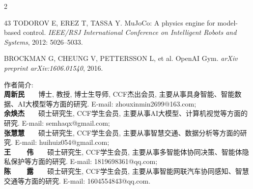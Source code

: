 \begin{multicols}{2}
{\begin{thebibliography}{43}
TODOROV E, EREZ T, TASSA Y. MuJoCo: A physics engine for model-based control. {\it IEEE/RSJ International Conference on Intelligent Robots and Systems}, 2012: 5026--5033.

BROCKMAN G, CHEUNG V, PETTERSSON L, et al. OpenAI Gym. {\it arXiv preprint arXiv:1606.01540}, 2016.


\end{thebibliography}}

 \vskip 7pt
\noindent
{ 作者简介:}\\
 {\scriptsize
\indent \textbf{周新民}~~~~博士, 教授, 博士生导师, CCF杰出会员, 主要从事具身智能、智能数据、AI大模型等方面的研究. E-mail: \mbox{zhouxinmin2699@163.com};\\
\indent \textbf{余焕杰}~~~~硕士研究生, CCF学生会员, 主要从事AI大模型、计算机视觉等方面的研究. E-mail: \mbox{semhaqx@gmail.com};\\
\indent \textbf{张慧慧}~~~~硕士研究生, CCF学生会员, 主要从事智慧交通、数据分析等方面的研究. E-mail: \mbox{huihuiz054@gmail.com};\\
\indent \textbf{王~~~~伟}~~~~硕士研究生, CCF学生会员, 主要从事多智能体协同决策、智能体隐私保护等方面的研究. E-mail: \mbox{1819698361@qq.com};\\
\indent \textbf{陈~~~~露}~~~~硕士研究生, CCF学生会员, 主要从事智能网联汽车协同感知、智慧交通等方面的研究. E-mail: \mbox{1604554843@qq.com}.}
\end{multicols}

